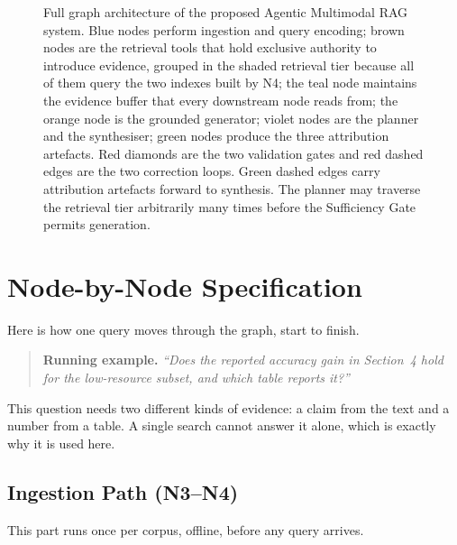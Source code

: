 \begin{figure}[p]
{%
}
\caption{Full graph architecture of the proposed Agentic Multimodal RAG system.
Blue nodes perform ingestion and query encoding; brown nodes are the retrieval
tools that hold exclusive authority to introduce evidence, grouped in the shaded
retrieval tier because all of them query the two indexes built by N4; the teal node maintains
the evidence buffer that every downstream node reads from; the orange node is the
grounded generator; violet nodes are the planner and the synthesiser; green nodes
produce the three attribution artefacts. Red diamonds are the two validation gates
and red dashed edges are the two correction loops. Green dashed edges carry
attribution artefacts forward to synthesis. The planner may traverse the retrieval
tier arbitrarily many times before the Sufficiency Gate permits generation.}
\label{fig:graph}
\end{figure}

\section{Node-by-Node Specification}

Here is how one query moves through the graph, start to finish.

\begin{quote}
\textbf{Running example.} \emph{``Does the reported accuracy gain in Section~4 hold
for the low-resource subset, and which table reports it?''}
\end{quote}

This question needs two different kinds of evidence: a claim from the text and a
number from a table. A single search cannot answer it alone, which is exactly why
it is used here.

\subsection{Ingestion Path (N3--N4)}

This part runs once per corpus, offline, before any query arrives.

